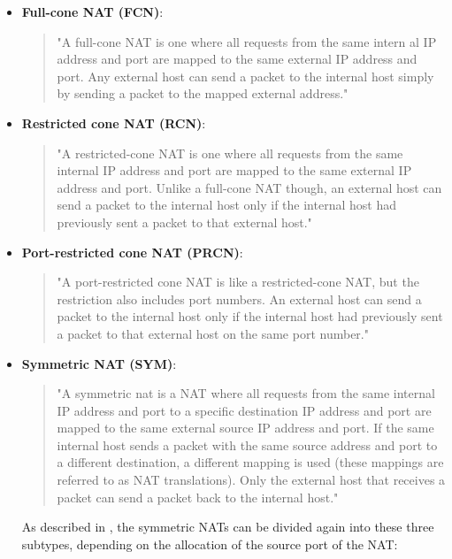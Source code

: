 \documentclass{article}
\begin{document}
\begin{itemize}

\item {\bf Full-cone NAT (FCN)}:

  \begin{quote}
    "A full-cone NAT is one where all requests from the same intern al
    IP address and port are mapped to the same external IP address and
    port. Any external host can send a packet to the internal host
    simply by sending a packet to the mapped external address."
\end{quote}
    
\item {\bf Restricted cone NAT (RCN)}:

  \begin{quote}
    "A restricted-cone NAT is one where all requests from the same
    internal IP address and port are mapped to the same external IP
    address and port. Unlike a full-cone NAT though, an external host
    can send a packet to the internal host only if the internal host
    had previously sent a packet to that external host."
  \end{quote}
    
\item {\bf Port-restricted cone NAT (PRCN)}:

  \begin{quote}
    "A port-restricted cone NAT is like a restricted-cone NAT, but the
    restriction also includes port numbers. An external host can send
    a packet to the internal host only if the internal host had
    previously sent a packet to that external host on the same port
    number."
  \end{quote}
    
\item {\bf Symmetric NAT (SYM)}:

  \begin{quote}
    "A symmetric nat is a NAT where all requests from the same
    internal IP address and port to a specific destination IP address
    and port are mapped to the same external source IP address and
    port. If the same internal host sends a packet with the same
    source address and port to a different destination, a different
    mapping is used (these mappings are referred to as NAT
    translations). Only the external host that receives a packet can
    send a packet back to the internal host."
  \end{quote}
  
As described in \cite{4}, the symmetric NATs can be divided again into
these three subtypes, depending on the allocation of the source port
of the NAT:


\end{itemize}
\end{document}
